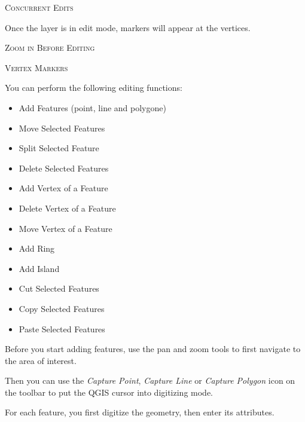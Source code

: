 \begin{Tip}[h]\caption{\textsc{Concurrent Edits}}
\end{Tip}

Once the layer is in edit mode, markers will appear at the
vertices.

\begin{Tip}[h]\caption{\textsc{Zoom in Before Editing}}
\end{Tip}

\begin{Tip}[h]\caption{\textsc{Vertex Markers}}
\end{Tip}

You can perform the following editing functions:

\begin{itemize}
\item Add Features (point, line and polygone)
\item Move Selected Features
\item Split Selected Feature
\item Delete Selected Features
\item Add Vertex of a Feature
\item Delete Vertex of a Feature
\item Move Vertex of a Feature
\item Add Ring
\item Add Island
\item Cut Selected Features
\item Copy Selected Features
\item Paste Selected Features
\end{itemize}


Before you start adding features, use the pan
and zoom tools to first navigate to the area of interest.

Then you can use the \textit{Capture Point}, \textit{Capture Line} 
or \textit{Capture Polygon} icon on the toolbar to put the QGIS cursor
into digitizing mode.

For each feature, you first digitize the geometry, then enter its attributes.

